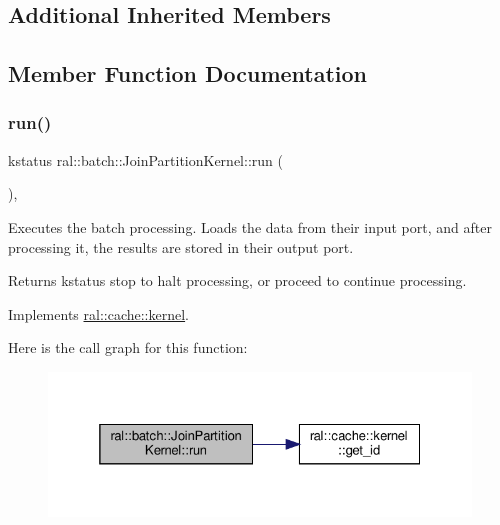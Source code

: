 \subsection*{Additional Inherited Members}


\subsection{Member Function Documentation}
\mbox{\label{classral_1_1batch_1_1JoinPartitionKernel_a7c96cd734ef57582b2bd8c2a7a86329e}} 
\subsubsection{\texorpdfstring{run()}{run()}}
{\footnotesize\ttfamily kstatus ral\+::batch\+::\+Join\+Partition\+Kernel\+::run (\begin{DoxyParamCaption}{ }\end{DoxyParamCaption})\hspace{0.3cm}{\ttfamily [override]}, {\ttfamily [virtual]}}



Executes the batch processing. Loads the data from their input port, and after processing it, the results are stored in their output port. 

\begin{DoxyReturn}{Returns}
kstatus \textquotesingle{}stop\textquotesingle{} to halt processing, or \textquotesingle{}proceed\textquotesingle{} to continue processing. 
\end{DoxyReturn}


Implements \hyperlink{classral_1_1cache_1_1kernel_a735b081cccae9574924e74ea6d293ef7}{ral\+::cache\+::kernel}.

Here is the call graph for this function\+:\nopagebreak
\begin{figure}[H]
\begin{center}
\leavevmode
\includegraphics[width=325pt]{classral_1_1batch_1_1JoinPartitionKernel_a7c96cd734ef57582b2bd8c2a7a86329e_cgraph}
\end{center}
\end{figure}


